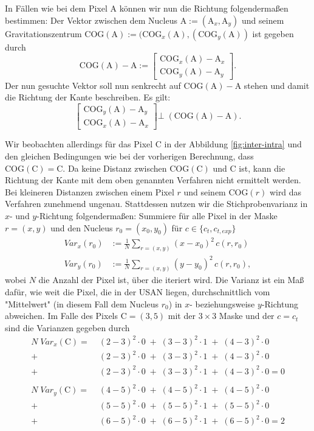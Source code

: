 \documentclass[a4paper, 11pt]{report}
\theoremstyle{definition}
\begin{document}
			In Fällen wie bei dem Pixel A können wir nun die Richtung folgendermaßen bestimmen: Der Vektor zwischen dem Nucleus $\text{A} := (\text{A}_x, \text{A}_y)$ und seinem Gravitationszentrum $\text{COG}(\text{A}) := (\text{COG}_x(\text{A}), (\text{COG}_y(\text{A}))$ ist gegeben durch $$\text{COG}(\text{A}) - \text{A} := \begin{bmatrix}\text{COG}_x(\text{A}) - \text{A}_x \\ \text{COG}_y(\text{A}) - \text{A}_y\end{bmatrix}.$$
			Der nun gesuchte Vektor soll nun senkrecht auf $\text{COG}(\text{A}) - \text{A}$ stehen und damit die Richtung der Kante beschreiben. Es gilt:
			$$\begin{bmatrix}\text{COG}_y(\text{A}) - \text{A}_y \\ \text{COG}_x(\text{A}) - \text{A}_x\end{bmatrix} \bot \; \left(\text{COG}(\text{A}) - \text{A}\right).$$

			Wir beobachten allerdings für das Pixel C in der Abbildung \ref{fig:inter-intra} und den gleichen Bedingungen wie bei der vorherigen Berechnung, dass $\text{COG}(\text{C}) = \text{C}$. Da keine Distanz zwischen $\text{COG}(\text{C})$ und C ist, kann die Richtung der Kante mit dem oben genannten Verfahren nicht ermittelt werden. Bei kleineren Distanzen zwischen einem Pixel $r$ und seinem $\text{COG}(r)$ wird das Verfahren zunehmend ungenau. Stattdessen nutzen wir die Stichprobenvarianz in $x$- und $y$-Richtung folgendermaßen: Summiere für alle Pixel in der Maske $r = (x, y)$ und den Nucleus $r_0 = (x_0, y_0)$ für $c \in \{c_t, c_{t,exp}\}$
			\begin{align*}
				Var_{x}(r_0) &:= \frac{1}{N}\sum_{r=(x,y)} (x-x_0)^2 \, c(r,r_0) \\
				Var_{y}(r_0) &:= \frac{1}{N}\sum_{r=(x,y)} (y-y_0)^2 \, c(r,r_0),
 			\end{align*}
 			wobei $N$ die Anzahl der Pixel ist, über die iteriert wird.
 			Die Varianz ist ein Maß dafür, wie weit die Pixel, die in der USAN liegen, durchschnittlich vom "Mittelwert" (in diesem Fall dem Nucleus $r_0$) in $x$- beziehungsweise $y$-Richtung abweichen. Im Falle des Pixels $\text{C} = (3,5)$ mit der $3\times3$ Maske und der $c = c_t$ sind die Varianzen gegeben durch
 			\begin{align*}
 				N \; Var_x(\text{C}) 	=\; &(2-3)^2 \cdot 0 \;+\; (3-3)^2 \cdot 1 \;+\; (4-3)^2 \cdot 0  \\
 										+\; &(2-3)^2 \cdot 0 \;+\; (3-3)^2 \cdot 1 \;+\; (4-3)^2 \cdot 0  \\
 										+\; &(2-3)^2 \cdot 0 \;+\; (3-3)^2 \cdot 1 \;+\; (4-3)^2 \cdot 0  = 0 \\
 										\\
 				N \; Var_y(\text{C}) 	=\; &(4-5)^2 \cdot 0 \;+\; (4-5)^2 \cdot 1 \;+\; (4-5)^2 \cdot 0  \\
 										+\; &(5-5)^2 \cdot 0 \;+\; (5-5)^2 \cdot 1 \;+\; (5-5)^2 \cdot 0  \\
 										+\; &(6-5)^2 \cdot 0 \;+\; (6-5)^2 \cdot 1 \;+\; (6-5)^2 \cdot 0  = 2 \\& 
 			\end{align*}
 			
\end{document}
